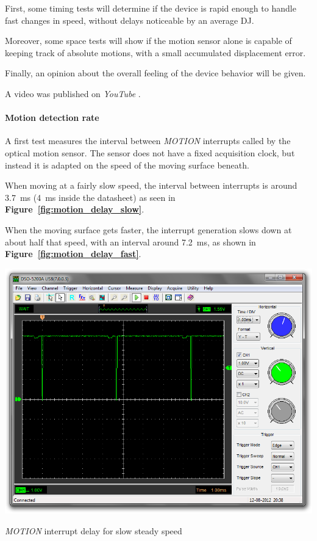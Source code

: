 \documentclass[a4paper,10pt]{article}
\makeatletter
\newenvironment{figurehere}{\def\@captype{figure}\vspace{2ex}}{\vspace{2ex}}
\newcommand{\citef}[1]{\textbf{Figure~\ref{#1}}}
\makeatother
\begin{document}
\begin{multicols}{2}
First, some timing tests will determine if the device is rapid enough to
handle fast changes in speed, without delays noticeable by an average DJ.

Moreover, some space tests will show if the motion sensor alone is capable
of keeping track of absolute motions, with a small accumulated displacement
error.

Finally, an opinion about the overall feeling of the device behavior will be
given.

A video was published on \emph{YouTube} \cite{youtube_ratt}.


\paragraph{Motion detection rate}
A first test measures the interval between \emph{MOTION} interrupts called by
the optical motion sensor. The sensor does not have a fixed acquisition clock,
but instead it is adapted on the speed of the moving surface beneath.

When moving at a fairly slow speed, the interval between interrupts is around
3.7~ms (4~ms inside the datasheet) as seen in \citef{fig:motion_delay_slow}.

When the moving surface gets faster, the interrupt generation slows down at
about half that speed, with an interval around 7.2~ms, as shown in
\citef{fig:motion_delay_fast}.

\begin{figurehere}
	\centering
	\includegraphics[keepaspectratio=true,width=\columnwidth]{images/motion_delay_slow.png}
	\caption{\emph{MOTION} interrupt delay for slow steady speed}
	\label{fig:motion_delay_slow}
\end{figurehere}


\end{multicols}
\end{document}
